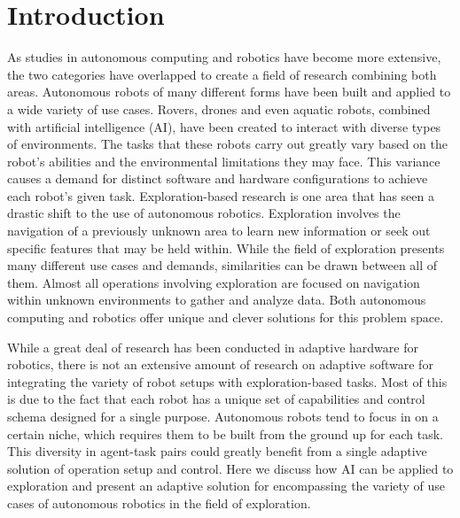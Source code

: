 

\chapter{Introduction} \label{ch:introduction}
As studies in autonomous computing and robotics have become more extensive, the two categories have overlapped to create a field of research combining both areas.
Autonomous robots of many different forms have been built and applied to a wide variety of use cases.
Rovers, drones and even aquatic robots, combined with artificial intelligence (AI), have been created to interact with diverse types of environments.
The tasks that these robots carry out greatly vary based on the robot's abilities and the environmental limitations they may face.
This variance causes a demand for distinct software and hardware configurations to achieve each robot's given task.
Exploration-based research is one area that has seen a drastic shift to the use of autonomous robotics.
Exploration involves the navigation of a previously unknown area to learn new information or seek out specific features that may be held within.
While the field of exploration presents many different use cases and demands, similarities can be drawn between all of them.
Almost all operations involving exploration are focused on navigation within unknown environments to gather and analyze data.
Both autonomous computing and robotics offer unique and clever solutions for this problem space.

While a great deal of research has been conducted in adaptive hardware for robotics, there is not an extensive amount of research on adaptive software for integrating the variety of robot setups with exploration-based tasks.
Most of this is due to the fact that each robot has a unique set of capabilities and control schema designed for a single purpose.
Autonomous robots tend to focus in on a certain niche, which requires them to be built from the ground up for each task.
This diversity in agent-task pairs could greatly benefit from a single adaptive solution of operation setup and control.
Here we discuss how AI can be applied to exploration and present an adaptive solution for encompassing the variety of use cases of autonomous robotics in the field of exploration.

